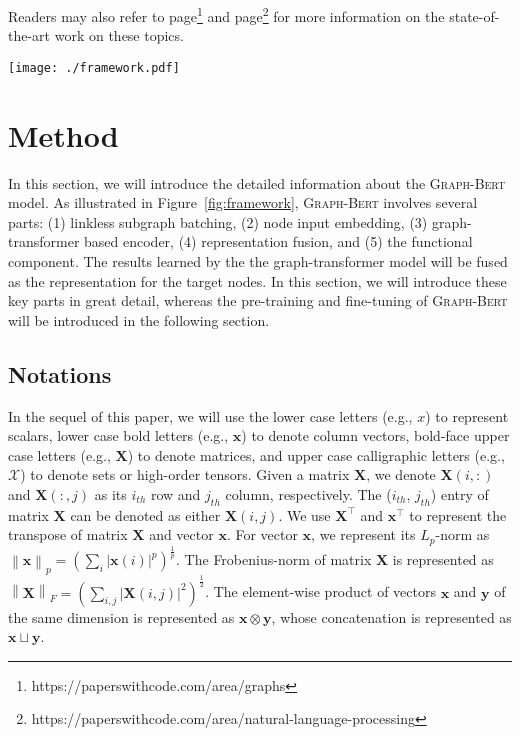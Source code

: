\documentclass{article}
\newcommand{\mb}{\mathbf}
\newcommand{\our}{\textsc{Graph-Bert}}
\begin{document}
\vspace{5pt}

Readers may also refer to page\footnote{https://paperswithcode.com/area/graphs} and page\footnote{https://paperswithcode.com/area/natural-language-processing} for more information on the state-of-the-art work on these topics.
\begin{figure*}
    \centering
    \begin{minipage}{.95\textwidth}
    	\texttt{[image: ./framework.pdf]}
     \end{minipage}\caption{Architecture of the {\our} Model. (Part 1: linkless subgraph batching; Part 2: node input vector embeddings; Part 3: graph transformer based encoder; Part 4: representation fusion; Part 5: functional component. Depending on the target application task, the function component will generate different output. In the sampled subgraphs, it covers both the target node and the surrounding context nodes.)}
    	\label{fig:framework}
\end{figure*}


\section{Method}\label{sec:method}

In this section, we will introduce the detailed information about the {\our} model. As illustrated in Figure~\ref{fig:framework}, {\our} involves several parts: (1) linkless subgraph batching, (2) node input embedding, (3) graph-transformer based encoder, (4) representation fusion, and (5) the functional component. The results learned by the the graph-transformer model will be fused as the representation for the target nodes. In this section, we will introduce these key parts in great detail, whereas the pre-training and fine-tuning of {\our} will be introduced in the following section.


\subsection{Notations}

In the sequel of this paper, we will use the lower case letters (e.g., $x$) to represent scalars, lower case bold letters (e.g., $\mb{x}$) to denote column vectors, bold-face upper case letters (e.g., $\mb{X}$) to denote matrices, and upper case calligraphic letters (e.g., $\mathcal{X}$) to denote sets or high-order tensors. Given a matrix $\mb{X}$, we denote $\mb{X}(i,:)$ and $\mb{X}(:,j)$ as its $i_{th}$ row and $j_{th}$ column, respectively. The ($i_{th}$, $j_{th}$) entry of matrix $\mb{X}$ can be denoted as either $\mb{X}(i,j)$. We use $\mb{X}^\top$ and $\mb{x}^\top$ to represent the transpose of matrix $\mb{X}$ and vector $\mb{x}$. For vector $\mb{x}$, we represent its $L_p$-norm as $\left\| \mb{x} \right\|_p = (\sum_i |\mb{x}(i)|^p)^{\frac{1}{p}}$. The Frobenius-norm of matrix $\mb{X}$ is represented as $\left\| \mb{X} \right\|_F = (\sum_{i,j} |\mb{X}(i,j)|^2)^{\frac{1}{2}}$. The element-wise product of vectors $\mb{x}$ and $\mb{y}$ of the same dimension is represented as $\mb{x} \otimes \mb{y}$, whose concatenation is represented as $\mb{x} \sqcup \mb{y}$.
\end{document}
